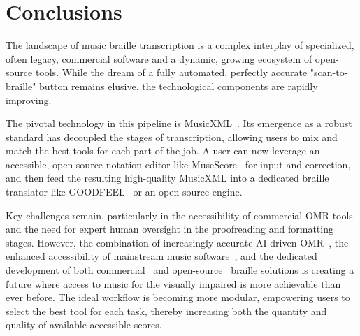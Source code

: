\section{Conclusions}\label{ch10:sec:conclusions}
The landscape of music braille transcription is a complex interplay of specialized, often legacy, commercial software and a dynamic, growing ecosystem of open-source tools. While the dream of a fully automated, perfectly accurate "scan-to-braille" button remains elusive, the technological components are rapidly improving.

The pivotal technology in this pipeline is \gls{MusicXML}~\supercite{daisy-musicxml}. Its emergence as a robust standard has decoupled the stages of transcription, allowing users to mix and match the best tools for each part of the job. A user can now leverage an accessible, open-source notation editor like MuseScore~\supercite{musescore-accessibility, soundwithoutsight-musescore} for input and correction, and then feed the resulting high-quality \gls{MusicXML} into a dedicated braille translator like GOODFEEL~\supercite{dancingdots-goodfeel} or an open-source engine.

Key challenges remain, particularly in the accessibility of commercial \gls{OMR} tools and the need for expert human oversight in the proofreading and formatting stages. However, the combination of increasingly accurate AI-driven \gls{OMR}~\supercite{sachindae-polyphonic-omr, GaetanBaert-OMRdeep}, the enhanced accessibility of mainstream music software~\supercite{musescore-accessibility}, and the dedicated development of both commercial~\supercite{dancingdots-goodfeel, DuxburyDBT} and open-source~\supercite{aph-brailleblaster, musicbraillerap-github} braille solutions is creating a future where access to music for the visually impaired is more achievable than ever before. The ideal workflow is becoming more modular, empowering users to select the best tool for each task, thereby increasing both the quantity and quality of available accessible scores.
